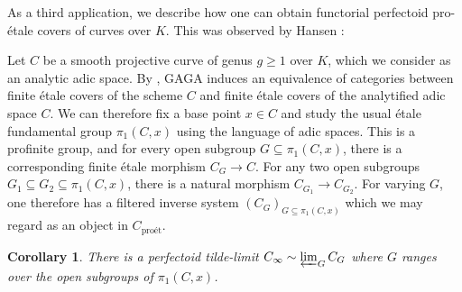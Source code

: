 \documentclass[10pt,oneside]{amsart}
\newtheorem{corollary}[theorem]{Corollary}
\theoremstyle{definition}
\begin{document}
As a third application, we describe how one can obtain functorial perfectoid pro-\'etale covers of curves over $K$. This was observed by Hansen \cite{Hansen-blog}:
	
	Let $C$ be a smooth projective curve of genus $g\geq 1$ over $K$, which we consider as an analytic adic space. By \cite[Theorem 3.1]{LutRiemann}, GAGA induces an equivalence of categories between finite \'etale covers of the scheme $C$ and finite \'etale covers of the analytified adic space $C$. We can therefore fix a base point $x\in C$ and study the usual \'etale fundamental group $\pi_1(C,x)$ using the language of adic spaces. This is a profinite group, and for every open subgroup $G\subseteq \pi_1(C,x)$, there is a corresponding finite \'etale morphism $C_G\to C$. For any two open subgroups $G_1\subseteq G_2\subseteq \pi_1(C,x)$, there is a natural morphism $C_{G_1}\to C_{G_2}$. For varying $G$, one therefore has a filtered inverse system $(C_G)_{G\subseteq \pi_1(C,x)}$ which we may regard as an object in $C_{\text{pro\'et}}$.
	\begin{corollary}
		There is a perfectoid tilde-limit $C_\infty \sim \varprojlim_{G}C_G$ where $G$ ranges over the open subgroups of $ \pi_1(C,x)$.
	\end{corollary}
	
\end{document}

